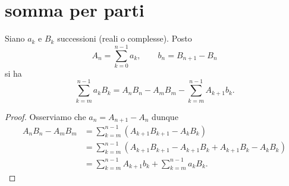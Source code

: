 

\section{somma per parti}
\begin{theorem}
\label{th:somma_per_parti}%
Siano $a_k$ e $B_k$ successioni (reali o complesse).
Posto
\[
  A_n = \sum_{k=0}^{n-1} a_k, \qquad
  b_n = B_{n+1} - B_n
\]
si ha
%
\begin{equation}\label{eq:somma_per_parti}
 \sum_{k=m}^{n-1} a_k B_k = A_n B_n - A_m B_m - \sum_{k=m}^{n-1} A_{k+1}b_k.
\end{equation}
\end{theorem}
%
\begin{proof}
Osserviamo che $a_n = A_{n+1}-A_n$ dunque
\begin{align*}
  A_n B_n - A_m B_m
  &= \sum_{k=m}^{n-1} (A_{k+1}B_{k+1}-A_k B_k)\\
  &= \sum_{k=m}^{n-1} (A_{k+1}B_{k+1}-A_{k+1}B_k + A_{k+1}B_k - A_k B_k)\\
  &= \sum_{k=m}^{n-1} A_{k+1}b_k + \sum_{k=m}^{n-1} a_k B_k.
\end{align*}
\end{proof}

